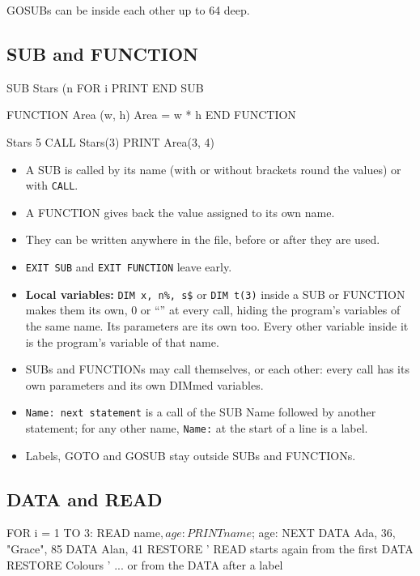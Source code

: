 GOSUBs can be inside each other up to 64 deep.

\subsection{SUB and FUNCTION}

\begin{type}
SUB Stars (n%
  FOR i%
  PRINT
END SUB

FUNCTION Area (w, h)
  Area = w * h
END FUNCTION

Stars 5
CALL Stars(3)
PRINT Area(3, 4)
\end{type}

\begin{itemize}
\item A SUB is called by its name (with or without brackets round the values) or with \verb|CALL|.
\item A FUNCTION gives back the value assigned to its own name.
\item They can be written anywhere in the file, before or after they are used.
\item \texttt{EXIT SUB} and \texttt{EXIT FUNCTION} leave early.
\item \textbf{Local variables:} \texttt{DIM x, n\%, s\$} or \texttt{DIM t(3)} inside a SUB or FUNCTION makes them its own, 0 or ``'' at every call, hiding the program's variables of the same name. Its parameters are its own too. Every other variable inside it is the program's variable of that name.
\item SUBs and FUNCTIONs may call themselves, or each other: every call has its own parameters and its own DIMmed variables.
\item \texttt{Name: next statement} is a call of the SUB Name followed by another statement; for any other name, \verb|Name:| at the start of a line is a label.
\item Labels, GOTO and GOSUB stay outside SUBs and FUNCTIONs.
\end{itemize}

\subsection{DATA and READ}

\begin{type}
FOR i = 1 TO 3: READ name$, age: PRINT name$; age: NEXT
DATA Ada, 36, "Grace", 85
DATA Alan, 41
RESTORE           ' READ starts again from the first DATA
RESTORE Colours   ' ... or from the DATA after a label
\end{type}

